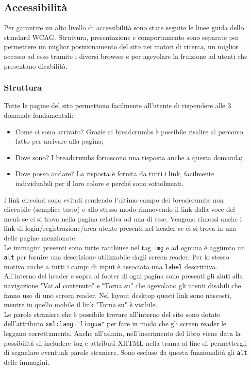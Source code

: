 \documentclass[12pt,a4paper,headings=optiontohead]{article}
\begin{document}
\subsection{Accessibilità}
	Per garantire un alto livello di accessibilità sono state seguite le linee guida dello standard WCAG. Struttura, presentazione e comportamento sono separate per permettere un miglior posizionamento del sito nei motori di ricerca, un miglior accesso ad esso tramite i diversi browser e per agevolare la fruizione ad utenti che presentano disabilità.

	\subsubsection{Struttura}
	Tutte le pagine del sito permettono facilmente all'utente di rispondere alle 3 domande fondamentali:
	\begin{itemize}
		\item Come ci sono arrivato? Grazie ai breadcrumbs è possibile risalire al percorso fatto per arrivare alla pagina;
		\item Dove sono? I breadcrumbs forniscono una risposta anche a questa domanda;
		\item Dove posso andare? La risposta è fornita da tutti i link, facilmente individuabili per il loro colore e perché sono sottolineati.
	\end{itemize} 
	I link circolari sono evitati rendendo l'ultimo campo dei breadcrumbs non cliccabile (semplice testo) e allo stesso modo rimuovendo il link dalla voce del menù se ci si trova nella pagina relativa ad una di esse. Vengono rimossi anche i link di login/registrazione/area utente presenti nel header se ci si trova in una delle pagine menzionate.  \\
	Le immagini presenti sono tutte racchiuse nel tag \texttt{img} e ad ognuna è aggiunto un \texttt{alt} per fornire una descrizione utilizzabile dagli screen reader. Per lo stesso motivo anche a tutti i campi di input è associata una \texttt{label} descrittiva. \\
	All'interno del header e sopra al footer di ogni pagina sono presenti gli aiuti alla navigazione "Vai al contenuto" e "Torna su" che agevolano gli utenti disabili che fanno uso di uno screen reader. Nel layout desktop questi link sono nascosti, mentre in quello mobile il link "Torna su" è visibile.\\
	Le parole straniere che è possibile trovare all'interno del sito sono dotate dell'attributo \texttt{xml:lang="lingua"} per fare in modo che gli screen reader le leggano correttamente. Anche all'admin, nell'inserimento del libro viene data la possibilità di includere tag e attributi XHTML nella trama al fine di permettergli di segnalare eventuali parole straniere. Sono escluse da questa funzionalità gli \texttt{alt} delle immagini.
\end{document}
